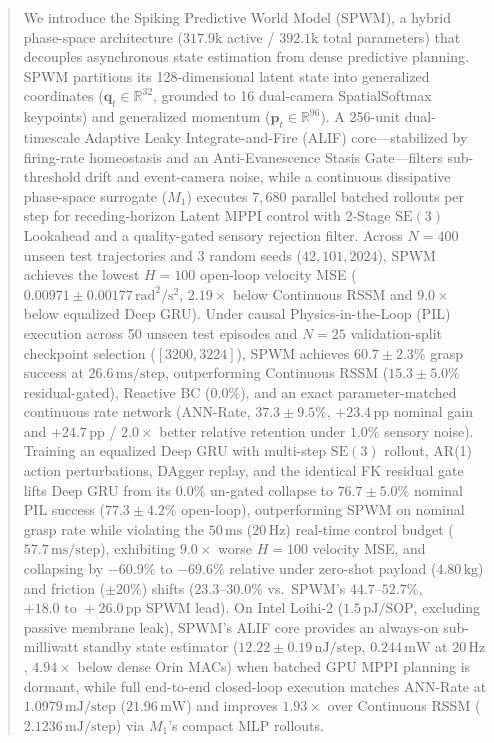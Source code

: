 \documentclass[11pt]{article}
\begin{document}
\begin{abstract}
We introduce the Spiking Predictive World Model (SPWM), a hybrid phase-space architecture ($317.9\text{k}$ active / $392.1\text{k}$ total parameters) that decouples asynchronous state estimation from dense predictive planning. SPWM partitions its 128-dimensional latent state into generalized coordinates ($\mathbf{q}_t \in \mathbb{R}^{32}$, grounded to 16 dual-camera SpatialSoftmax keypoints) and generalized momentum ($\mathbf{p}_t \in \mathbb{R}^{96}$). A 256-unit dual-timescale Adaptive Leaky Integrate-and-Fire (ALIF) core---stabilized by firing-rate homeostasis and an Anti-Evanescence Stasis Gate---filters sub-threshold drift and event-camera noise, while a continuous dissipative phase-space surrogate ($M_1$) executes $7{,}680$ parallel batched rollouts per step for receding-horizon Latent MPPI control with 2-Stage $\text{SE}(3)$ Lookahead and a quality-gated sensory rejection filter. Across $N=400$ unseen test trajectories and 3 random seeds ($42, 101, 2024$), SPWM achieves the lowest $H=100$ open-loop velocity MSE ($0.00971 \pm 0.00177\,\text{rad}^2/\text{s}^2$, $2.19\times$ below Continuous RSSM and $9.0\times$ below equalized Deep GRU). Under causal Physics-in-the-Loop (PIL) execution across 50 unseen test episodes and $N=25$ validation-split checkpoint selection ($[3200, 3224]$), SPWM achieves $60.7 \pm 2.3\%$ grasp success at $26.6\,\text{ms/step}$, outperforming Continuous RSSM ($15.3 \pm 5.0\%$ residual-gated), Reactive BC ($0.0\%$), and an exact parameter-matched continuous rate network (ANN-Rate, $37.3 \pm 9.5\%$, $+23.4\,\text{pp}$ nominal gain and $+24.7\,\text{pp}$ / $2.0\times$ better relative retention under $1.0\%$ sensory noise). Training an equalized Deep GRU with multi-step $\text{SE}(3)$ rollout, AR(1) action perturbations, DAgger replay, and the identical FK residual gate lifts Deep GRU from its $0.0\%$ un-gated collapse to $76.7 \pm 5.0\%$ nominal PIL success ($77.3 \pm 4.2\%$ open-loop), outperforming SPWM on nominal grasp rate while violating the $50\,\text{ms}$ ($20\,\text{Hz}$) real-time control budget ($57.7\,\text{ms/step}$), exhibiting $9.0\times$ worse $H=100$ velocity MSE, and collapsing by $-60.9\%$ to $-69.6\%$ relative under zero-shot payload ($4.80\,\text{kg}$) and friction ($\pm 20\%$) shifts ($23.3\text{--}30.0\%$ vs.\ SPWM's $44.7\text{--}52.7\%$, $+18.0\text{ to }+26.0\,\text{pp}$ SPWM lead). On Intel Loihi-2 ($1.5\,\text{pJ/SOP}$, excluding passive membrane leak), SPWM's ALIF core provides an always-on sub-milliwatt standby state estimator ($12.22 \pm 0.19\,\text{nJ/step}$, $0.244\,\text{mW}$ at $20\,\text{Hz}$, $4.94\times$ below dense Orin MACs) when batched GPU MPPI planning is dormant, while full end-to-end closed-loop execution matches ANN-Rate at $1.0979\,\text{mJ/step}$ ($21.96\,\text{mW}$) and improves $1.93\times$ over Continuous RSSM ($2.1236\,\text{mJ/step}$) via $M_1$'s compact MLP rollouts.
\end{abstract}
\end{document}
